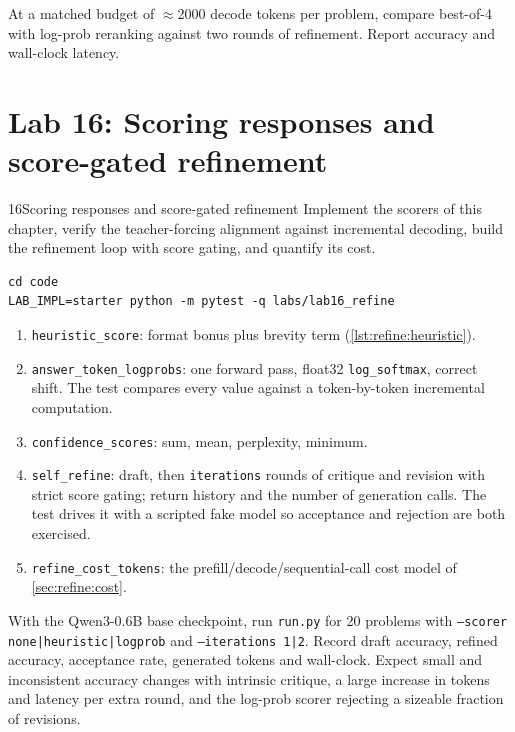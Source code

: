 \begin{exercise}
At a matched budget of $\approx$2000 decode tokens per problem, compare best-of-4 with log-prob
reranking against two rounds of refinement. Report accuracy and wall-clock latency.
\end{exercise}

\section{Lab 16: Scoring responses and score-gated refinement}\label{sec:refine:lab}

\begin{labbox}{16}{Scoring responses and score-gated refinement}
Implement the scorers of this chapter, verify the teacher-forcing alignment against incremental
decoding, build the refinement loop with score gating, and quantify its cost.

\begin{lstlisting}[style=shell]
cd code
LAB_IMPL=starter python -m pytest -q labs/lab16_refine
\end{lstlisting}

\begin{enumerate}
  \item \texttt{heuristic\_score}: format bonus plus brevity term (\cref{lst:refine:heuristic}).
  \item \texttt{answer\_token\_logprobs}: one forward pass, float32 \texttt{log\_softmax}, correct
  shift. The test compares every value against a token-by-token incremental computation.
  \item \texttt{confidence\_scores}: sum, mean, perplexity, minimum.
  \item \texttt{self\_refine}: draft, then \texttt{iterations} rounds of critique and revision with
  strict score gating; return history and the number of generation calls. The test drives it with a
  scripted fake model so acceptance and rejection are both exercised.
  \item \texttt{refine\_cost\_tokens}: the prefill/decode/sequential-call cost model of
  \cref{sec:refine:cost}.
\end{enumerate}

With the Qwen3-0.6B base checkpoint, run \texttt{run.py} for 20 problems with
\texttt{--scorer none|heuristic|logprob} and \texttt{--iterations 1|2}. Record draft accuracy,
refined accuracy, acceptance rate, generated tokens and wall-clock. Expect small and inconsistent
accuracy changes with intrinsic critique, a large increase in tokens and latency per extra round, and
the log-prob scorer rejecting a sizeable fraction of revisions.


\end{labbox}
